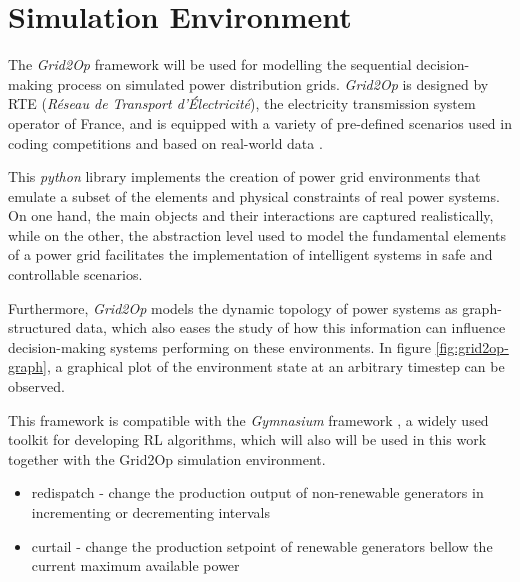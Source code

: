 \section{Simulation Environment} \label{sec:method-environment}

The \textit{Grid2Op} framework \cite{rtefranceGrid2OpDocumentation} will be used for modelling the sequential decision-making process on simulated power distribution grids. \textit{Grid2Op} is designed by RTE (\textit{Réseau de Transport d'Électricité}), the electricity transmission system operator of France, and is equipped with a variety of pre-defined scenarios used in coding competitions and based on real-world data \cite{rtefranceGrid2OpDocumentation}. \par
This \textit{python} library implements the creation of power grid environments that emulate a subset of the elements and physical constraints of real power systems. On one hand, the main objects and their interactions are captured realistically, while on the other, the abstraction level used to model the fundamental elements of a power grid facilitates the implementation of intelligent systems in safe and controllable scenarios. \par
Furthermore, \textit{Grid2Op} models the dynamic topology of power systems as graph-structured data, which also eases the study of how this information can influence decision-making systems performing on these environments.  In figure \ref{fig:grid2op-graph}, a graphical plot of the environment state at an arbitrary timestep can be observed. \par
This framework is compatible with the \textit{Gymnasium} framework \cite{faramafoundationGymnasiumDocumentation}, a widely used toolkit for developing \ac{RL} algorithms, which will also will be used in this work together with the Grid2Op simulation environment. 

\begin{itemize}
	\item redispatch - change the production output of non-renewable generators in incrementing or decrementing intervals 
	\item curtail - change the production setpoint of renewable generators bellow the current maximum available power \cite{rtefranceGrid2OpDocumentation}
\end{itemize}



